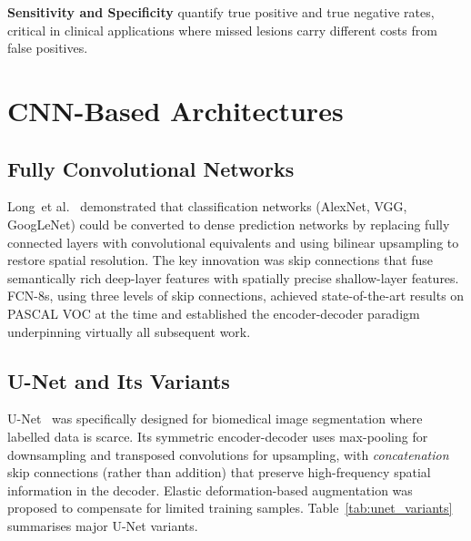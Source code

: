 \documentclass[preprint,12pt,authoryear]{elsarticle}
\begin{document}
\textbf{Sensitivity and Specificity} quantify true positive and true negative
rates, critical in clinical applications where missed lesions carry different
costs from false positives.

\section{CNN-Based Architectures}
\label{sec:cnn}

\subsection{Fully Convolutional Networks}
\label{sec:fcn}

Long~et al.~\citep{long2015fcn} demonstrated that classification networks
(AlexNet, VGG, GoogLeNet) could be converted to dense prediction networks by
replacing fully connected layers with convolutional equivalents and using
bilinear upsampling to restore spatial resolution. The key innovation was skip
connections that fuse semantically rich deep-layer features with spatially
precise shallow-layer features. FCN-8s, using three levels of skip connections,
achieved state-of-the-art results on PASCAL VOC at the time and established the
encoder-decoder paradigm underpinning virtually all subsequent work.

\subsection{U-Net and Its Variants}
\label{sec:unet}

U-Net~\citep{ronneberger2015unet} was specifically designed for biomedical image
segmentation where labelled data is scarce. Its symmetric encoder-decoder uses
max-pooling for downsampling and transposed convolutions for upsampling, with
\emph{concatenation} skip connections (rather than addition) that preserve
high-frequency spatial information in the decoder. Elastic deformation-based
augmentation was proposed to compensate for limited training samples.
Table~\ref{tab:unet_variants} summarises major U-Net variants.
\end{document}
